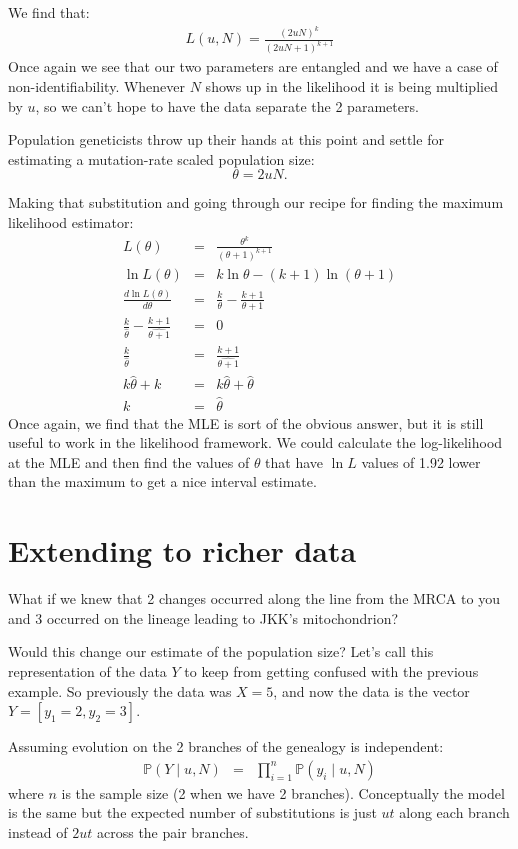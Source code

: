 \documentclass[11pt]{article}
\renewcommand{\Pr}{\mathbb{P}}
\begin{document}
We find that:
\begin{eqnarray}
L(u, N)  = \frac{(2uN)^k}{(2uN + 1)^{k+1}}
\end{eqnarray}
Once again we see that our two parameters are entangled and we have a case of non-identifiability.
Whenever $N$ shows up in the likelihood it is being multiplied by $u$, so we can't hope to 
have the data separate the 2 parameters.

Population geneticists throw up their hands at this point and settle for estimating a mutation-rate scaled population size:
$$\theta = 2uN.$$

Making that substitution and going through our recipe for finding the maximum likelihood estimator:
\begin{eqnarray}
L(\theta)  & = & \frac{\theta^k}{(\theta + 1)^{k+1}} \\
\ln L(\theta)  & = & k\ln\theta - (k+1) \ln(\theta + 1) \\
\frac{d\ln L(\theta)}{d\theta} & = & \frac{k}{\theta} - \frac{k + 1}{\theta + 1} \\
\frac{k}{\hat{\theta}} - \frac{k + 1}{\hat{\theta + 1}} & = & 0 \\ 
\frac{k}{\hat{\theta}} & = &  \frac{k + 1}{\hat{\theta + 1}} \\
k\hat{\theta} + k & = & k\hat{\theta} + \hat{\theta} \\
k & = & \hat{\theta}
\end{eqnarray}
Once again, we find that the MLE is sort of the obvious answer, but it is still
useful to work in the likelihood framework.
We could calculate the log-likelihood at the MLE and then find
the values of $\theta$ that have $\ln L$ values of 1.92 lower than the maximum
to get a nice interval estimate.

\section{Extending to richer data}
What if we knew that 2 changes occurred along the line from the MRCA to you and 3 occurred 
on the lineage leading to JKK's mitochondrion?

Would this change our estimate of the population size?
Let's call this representation of the data $Y$ to keep from getting confused with the previous
    example.
So previously the data was $X=5$, and now the data is the vector $Y = [y_1=2, y_2=3]$.

Assuming evolution on the 2 branches of the genealogy is independent:
\begin{eqnarray}
\Pr(Y \mid u, N) & = & \prod_{i=1}^{n} \Pr(y_i \mid u, N)
\end{eqnarray}
where $n$ is the sample size (2 when we have 2 branches).
Conceptually the model is the same but the expected number of substitutions
    is just $ut$ along each branch instead of $2ut$ across the pair branches.
\end{document}
